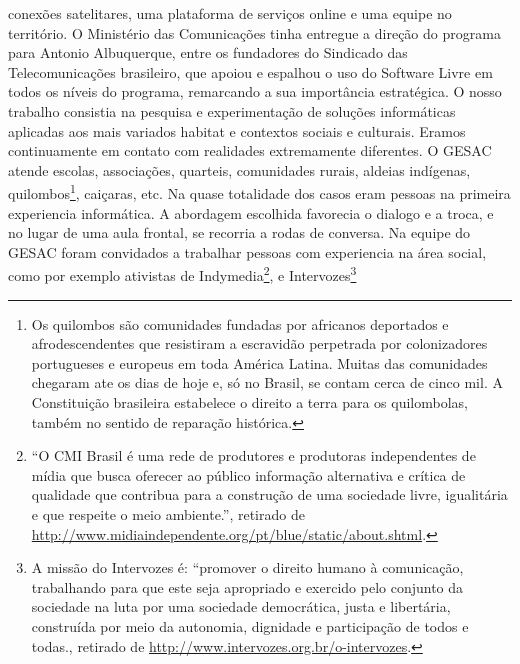 conexões satelitares, uma plataforma de serviços online e uma equipe
no território. O Ministério das Comunicações tinha entregue a direção
do programa para Antonio Albuquerque, entre os fundadores do Sindicado
das Telecomunicações brasileiro, que apoiou e espalhou o uso do
Software Livre em todos os níveis do programa, remarcando a sua
importância estratégica. O nosso trabalho consistia na pesquisa e
experimentação de soluções informáticas aplicadas aos mais variados
habitat e contextos sociais e culturais. Eramos continuamente em
contato com realidades extremamente diferentes. O GESAC atende
escolas, associações, quarteis, comunidades rurais, aldeias indígenas,
quilombos\footnote{Os quilombos são comunidades fundadas por africanos
  deportados e afrodescendentes que resistiram a escravidão perpetrada
  por colonizadores portugueses e europeus em toda América
  Latina. Muitas das comunidades chegaram ate os dias de hoje e, só no
  Brasil, se contam cerca de cinco mil. A Constituição brasileira
  estabelece o direito a terra para os quilombolas, também no sentido
  de reparação histórica.}, caiçaras, etc. Na quase totalidade dos
casos eram pessoas na primeira experiencia informática. A abordagem
escolhida favorecia o dialogo e a troca, e no lugar de uma aula
frontal, se recorria a rodas de conversa. Na equipe do GESAC foram
convidados a trabalhar pessoas com experiencia na área social, como
por exemplo ativistas de Indymedia\footnote{``O CMI Brasil é uma rede
  de produtores e produtoras independentes de mídia que busca oferecer
  ao público informação alternativa e crítica de qualidade que
  contribua para a construção de uma sociedade livre, igualitária e
  que respeite o meio ambiente.'', retirado de
  \url{http://www.midiaindependente.org/pt/blue/static/about.shtml}.},
e Intervozes\footnote{A missão do Intervozes é: ``promover o direito
  humano à comunicação, trabalhando para que este seja apropriado e
  exercido pelo conjunto da sociedade na luta por uma sociedade
  democrática, justa e libertária, construída por meio da autonomia,
  dignidade e participação de todos e todas., retirado de
  \url{http://www.intervozes.org.br/o-intervozes}.}


